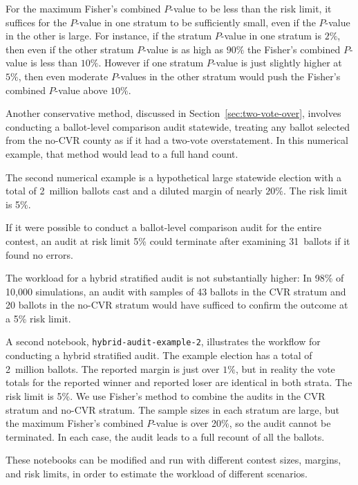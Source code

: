 \documentclass[runningheads]{llncs}
\newcommand{\comment}[1]{}
\begin{document}
For the maximum Fisher's combined $P$-value to be less than the risk limit,
it suffices for the $P$-value in one stratum to be sufficiently small, even if 
the $P$-value in the other is large. 
For instance, if the stratum $P$-value in one stratum is $2\%$,
then even if the other stratum $P$-value is as high as $90\%$
the Fisher's combined $P$-value is less than $10\%$.
However if one stratum $P$-value is just slightly higher at $5\%$,
then even moderate $P$-values in the other stratum would push 
the Fisher's combined $P$-value above $10\%$.

Another conservative method, discussed in Section~\ref{sec:two-vote-over},
involves conducting a ballot-level comparison audit statewide,
treating any ballot selected from the no-CVR county as if it had a two-vote overstatement.
In this numerical example, that method would lead to a full hand count.

The second numerical example is a hypothetical large statewide election with a total of 
2~million ballots cast and a diluted margin of nearly $20\%$.  
The risk limit is 5\%.
\comment{How many ballots in each stratum?}
If it were possible to conduct a ballot-level comparison audit for the entire contest, 
an audit at risk limit 5\% could terminate after examining 31~ballots if it found no errors.

The workload for a hybrid stratified audit is not substantially higher:
In 98\% of 10,000 simulations, an audit with samples of 43 ballots in the 
CVR stratum and 20 ballots in the no-CVR stratum
would have sufficed to confirm the outcome at a 5\% risk limit.

A second notebook, \texttt{hybrid-audit-example-2}, illustrates the workflow for conducting a hybrid 
stratified audit.
The example election has a total of 2~million ballots.
The reported margin is just over $1\%$, but in reality the vote totals for the reported winner
and reported loser are identical in both strata.  The risk limit is 5\%.
We use Fisher's method to combine the audits in the CVR stratum and no-CVR stratum.
The sample sizes in each stratum are large, but the maximum Fisher's combined $P$-value is over 20\%,
so the audit cannot be terminated.
In each case, the audit leads to a full recount of all the ballots.

These notebooks can be modified and run with different contest sizes, margins, and risk limits, in order to
estimate the workload of different scenarios.


\end{document}
